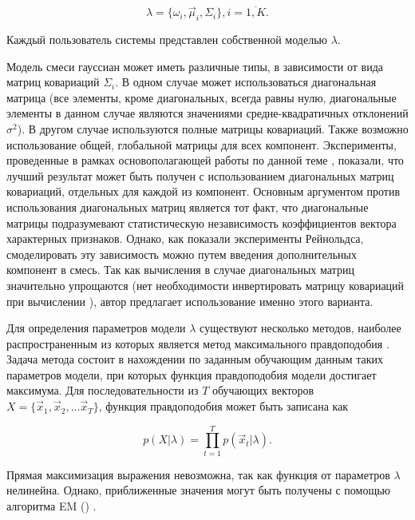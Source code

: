 \begin{equation}
\lambda = \{ \omega_i, \vec \mu_i, \Sigma_i  \}, i = \overline{1,K}.
\end{equation}

Каждый пользователь системы представлен собственной моделью $\lambda$.

Модель смеси гауссиан может иметь различные типы, в зависимости от вида матриц ковариаций $\Sigma_i$. В одном случае может использоваться диагональная матрица (все элементы, кроме диагональных, всегда равны нулю, диагональные элементы в данном случае являются значениями средне-квадратичных отклонений $\sigma^2$). В другом случае используются полные матрицы ковариаций. Также возможно использование общей, глобальной матрицы для всех компонент. Эксперименты, проведенные в рамках основополагающей работы по данной теме \cite{Reynolds95gmm}, показали, что лучший результат может быть получен с использованием диагональных матриц ковариаций, отдельных для каждой из компонент. Основным аргументом против использования диагональных матриц является тот факт, что диагональные матрицы подразумевают статистическую независимость коэффициентов вектора характерных признаков. Однако, как показали эксперименты Рейнольдса, смоделировать эту зависимость можно путем введения дополнительных компонент в смесь. Так как вычисления в случае диагональных матриц значительно упрощаются (нет необходимости инвертировать матрицу ковариаций при вычислении ), автор предлагает использование именно этого варианта.

Для определения параметров модели $\lambda$ существуют несколько методов, наиболее распространенным из которых является метод максимального правдоподобия \cite{BMSTUM17}. Задача метода состоит в нахождении по заданным обучающим данным таких параметров модели, при которых функция правдоподобия модели достигает максимума. Для последовательности из $T$ обучающих векторов $X = \{ \vec x_1, \vec x_2, \ldots \vec x_T \}$, функция правдоподобия может быть записана как

\begin{equation}
\label{eq:likelihood}
p(X | \lambda) = \prod_{t=1}^T p(\vec x_t | \lambda).
\end{equation}

Прямая максимизация выражения  невозможна, так как функция от параметров $\lambda$ нелинейна. Однако, приближенные значения могут быть получены с помощью алгоритма EM () \cite{Dempster77EM}.

